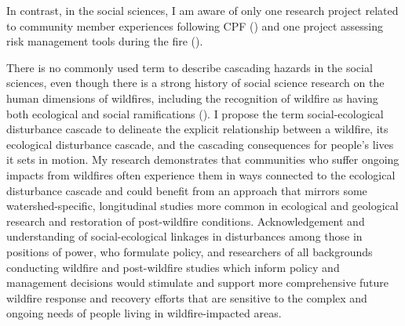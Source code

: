\documentclass[
]{article}
\begin{document}
In contrast, in the social sciences, I am aware of only one research project related to community member experiences following CPF () and one project assessing risk management tools during the fire ().

There is no commonly used term to describe cascading hazards in the social sciences, even though there is a strong history of social science research on the human dimensions of wildfires, including the recognition of wildfire as having both ecological and social ramifications (). I propose the term social-ecological disturbance cascade to delineate the explicit relationship between a wildfire, its ecological disturbance cascade, and the cascading consequences for people's lives it sets in motion. My research demonstrates that communities who suffer ongoing impacts from wildfires often experience them in ways connected to the ecological disturbance cascade and could benefit from an approach that mirrors some watershed-specific, longitudinal studies more common in ecological and geological research and restoration of post-wildfire conditions. Acknowledgement and understanding of social-ecological linkages in disturbances among those in positions of power, who formulate policy, and researchers of all backgrounds conducting wildfire and post-wildfire studies which inform policy and management decisions would stimulate and support more comprehensive future wildfire response and recovery efforts that are sensitive to the complex and ongoing needs of people living in wildfire-impacted areas.
\end{document}
